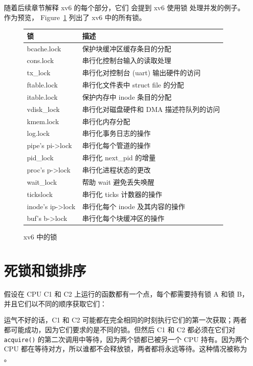 随着后续章节解释 xv6 的每个部分，它们
会提到 xv6 使用锁
处理并发的例子。
作为预览，
Figure~\ref{fig:locktable}
列出了 xv6 中的所有锁。

\begin{figure}[t]
\centering
\begin{tabular}{ll}
{\bf 锁} & {\bf 描述} \\
\midrule
bcache.lock & 保护块缓冲区缓存条目的分配 \\
cons.lock & 串行化控制台输入的读取处理 \\
tx\_lock & 串行化对控制台 (uart) 输出硬件的访问 \\
ftable.lock & 串行化文件表中 struct file 的分配 \\
itable.lock & 保护内存中 inode 条目的分配 \\
vdisk\_lock & 串行化对磁盘硬件和 DMA 描述符队列的访问 \\
kmem.lock & 串行化内存分配 \\
log.lock & 串行化事务日志的操作 \\
pipe's pi->lock & 串行化每个管道的操作 \\
pid\_lock & 串行化 next\_pid 的增量 \\
proc's p->lock & 串行化进程状态的更改 \\
wait\_lock & 帮助 wait 避免丢失唤醒 \\
tickslock & 串行化 ticks 计数器的操作 \\
inode's ip->lock & 串行化每个 inode 及其内容的操作 \\
buf's b->lock & 串行化每个块缓冲区的操作 \\
\end{tabular}
\caption{xv6 中的锁}
\label{fig:locktable}
\end{figure}

\newpage
\section{死锁和锁排序}

假设在 CPU C1 和 C2 上运行的函数都有一个点，每个都需要持有锁 A 和锁 B，并且它们以不同的顺序获取它们：

\begin{center}
  
\end{center}

运气不好的话，C1 和 C2 可能都在完全相同的时刻执行它们的第一次获取；两者都可能成功，因为它们要求的是不同的锁。但然后 C1 和 C2 都必须在它们对 {\tt acquire()} 的第二次调用中等待，因为两个锁都已被另一个 CPU 持有。因为两个 CPU 都在等待对方，所以谁都不会释放锁，两者都将永远等待。这种情况被称为
。

